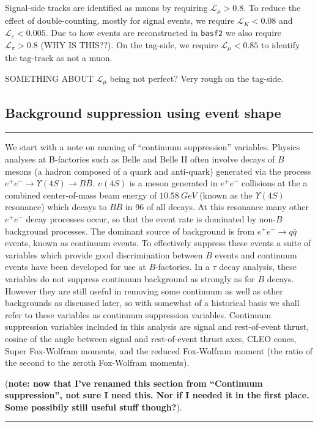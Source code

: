 \documentclass[12pt]{thesis}  %
\begin{document}
Signal-side tracks are identified as muons by requiring $\mathcal{L}_{\mu} > 0.8$. To reduce the effect of double-counting, mostly for signal events, we require $\mathcal{L}_{K} < 0.08$ and $\mathcal{L}_{e} < 0.005$. Due to how events are reconstructed in \texttt{basf2} we also require $\mathcal{L}_{\pi} > 0.8$ (WHY IS THIS??). On the tag-side, we require $\mathcal{L}_{\mu} < 0.85$ to identify the tag-track as not a muon.

SOMETHING ABOUT $\mathcal{L}_{\mu}$ being not perfect? Very rough on the tag-side.


\subsection{Background suppression using event shape}

\hrule

We start with a note on naming of ``continuum suppression'' variables. Physics analyses at B-factories such as Belle and Belle II often involve decays of $B$ mesons (a hadron composed of a quark and anti-quark) generated via the process $e^+ e^- \to \Upsilon(4S)\to B \bar{B}$. $\upsilon(4S)$ is a meson generated in $e^+ e^-$ collisions at the a combined center-of-mass beam energy of $\SI{10.58}{GeV}$ (known as the $\Upsilon(4S)$ resonance) which decays to $B\bar{B}$ in \num{96}{\percent} of all decays. At this resonance many other $e^+ e^-$ decay processes occur, so that the event rate is dominated by non-$B$ background processes. The dominant source of background is from $e^+ e^- \to q\bar{q}$ events, known as continuum events. To effectively suppress these events a suite of variables which provide good discrimination between $B$ events and continuum events have been developed for use at $B$-factories. In a $\tau$ decay analysis, these variables do not suppress continuum background as strongly as for $B$ decays. However they are still useful in removing some continuum as well as other backgrounds as discussed later, so with somewhat of a historical basis we shall refer to these variables as continuum suppression variables. Continuum suppression variables included in this analysis are signal and rest-of-event thrust, cosine of the angle between signal and rest-of-event thrust axes,  CLEO cones, Super Fox-Wolfram moments, and the reduced Fox-Wolfram moment (the ratio of the second to the zeroth Fox-Wolfram moments).

(\textbf{note: now that I've renamed this section from ``Continuum suppression'', not sure I need this. Nor if I needed it in the first place. Some possibily still useful stuff though?}).
\hrule
\end{document}
